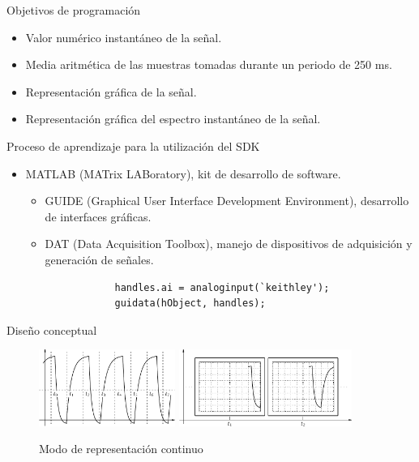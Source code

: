 \documentclass[utf8, compress]			{beamer}
\begin{document}
\begin{frame}{Objetivos de programación}
    \begin{itemize}
	\item Valor numérico instantáneo de la señal.
	\item Media aritmética de las muestras tomadas durante un
	    periodo de 250 ms.
	\item Representación gráfica de la señal.
	\item Representación gráfica del espectro instantáneo de la
	    señal.
    \end{itemize}
\end{frame}

\begin{frame}[fragile]{Proceso de aprendizaje para la utilización del SDK}
    \begin{itemize}
	\item MATLAB (MATrix LABoratory), kit de desarrollo de software.
	    \begin{itemize}
		\item GUIDE (Graphical User Interface Development
		    Environment), desarrollo de interfaces gráficas.
		\item DAT (Data Acquisition Toolbox), manejo de
		    dispositivos de adquisición y generación de señales.
		    \vspace{\baselineskip}
		    \begin{lstlisting}
			handles.ai = analoginput(`keithley');
			guidata(hObject, handles);
		    \end{lstlisting}
	    \end{itemize}
    \end{itemize}
\end{frame}

\begin{frame}{Diseño conceptual}
    \begin{figure}
	\hfill
	\includegraphics[height=25mm, keepaspectratio]{ventanas.pdf}
	\hspace{1em}
	\includegraphics[height=25mm, keepaspectratio]{continuo.pdf}
	\hfill
	\caption{Modo de representación continuo}
	\label{fig:continuous}
    \end{figure}
\end{frame}
\end{document}
